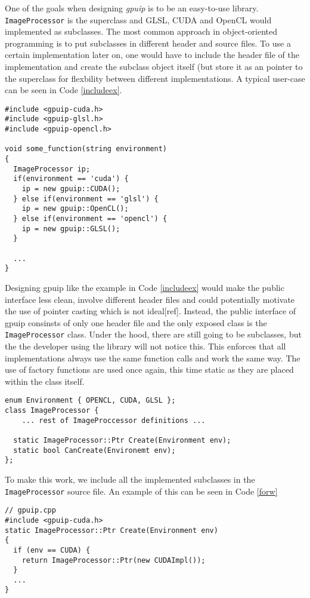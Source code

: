 One of the goals when designing \emph{gpuip} is to be an easy-to-use library. {\tt ImageProcessor} is the superclass and GLSL, CUDA and OpenCL would implemented as subclasses. The most common approach in object-oriented programming is to put subclasses in different header and source files. To use a certain implementation later on, one would have to include the header file of the implementation and create the subclass object itself (but store it as an pointer to the superclass for flexbility between different implementations. A typical user-case can be seen in Code \ref{includeex}.
\renewcommand{\lstlistingname}{Code}
\begin{lstlisting}[caption= Example of common use of object-oriented programming, label=includeex]
#include <gpuip-cuda.h>
#include <gpuip-glsl.h>
#include <gpuip-opencl.h>

void some_function(string environment)
{
  ImageProcessor ip;
  if(environment == 'cuda') {
    ip = new gpuip::CUDA();
  } else if(environment == 'glsl') {
    ip = new gpuip::OpenCL();
  } else if(environment == 'opencl') {
    ip = new gpuip::GLSL();
  }

  ...
}
\end{lstlisting}

Designing gpuip like the example in Code \ref{includeex} would make the public interface less clean, involve different header files and could potentially motivate the use of pointer casting which is not ideal[ref]. Instead, the public interface of gpuip consinsts of only one header file and the only exposed class is the {\tt ImageProcessor} class. Under the hood, there are still going to be subclasses, but the the developer using the library will not notice this. This enforces that all implementations always use the same function calls and work the same way. The use of factory functions are used once again, this time static as they are placed within the class itself.
\newline
\begin{lstlisting}[caption= {\tt ImageProcessor} static API, label=ipapi]
enum Environment { OPENCL, CUDA, GLSL };
class ImageProcessor {
    ... rest of ImageProccessor definitions ...

  static ImageProcessor::Ptr Create(Environment env);
  static bool CanCreate(Environemt env);
};
\end{lstlisting}

To make this work, we include all the implemented subclasses in the {\tt ImageProcessor} source file. An example of this can be seen in Code \ref{forw}
\newline
\begin{lstlisting}[caption= {\tt ImageProcessor::Create} spawns instances of subclasses to itself, label=ipapi]
// gpuip.cpp
#include <gpuip-cuda.h> 
static ImageProcessor::Ptr Create(Environment env)
{
  if (env == CUDA) {
    return ImageProcessor::Ptr(new CUDAImpl());
  }
  ...
}
\end{lstlisting}
